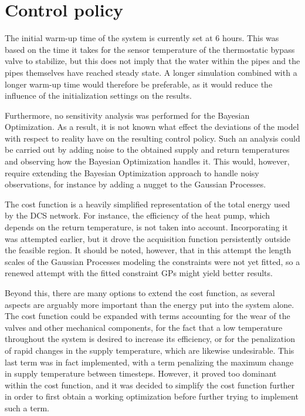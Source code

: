 

\section{Control policy}
The initial warm-up time of the system is currently set at 6 hours. This was based on the time it takes for the sensor temperature of the thermostatic bypass valve to stabilize, but this does not imply that the water within the pipes and the pipes themselves have reached steady state. A longer simulation combined with a longer warm-up time would therefore be preferable, as it would reduce the influence of the initialization settings on the results.

Furthermore, no sensitivity analysis was performed for the Bayesian 
Optimization. As a result, it is not known what effect the deviations of the model with respect to reality have on the resulting control policy. Such an analysis could be carried out by adding noise to the obtained supply and return temperatures and observing how the Bayesian Optimization handles it. This would, however, require extending the Bayesian Optimization approach to handle noisy observations, for instance by adding a nugget to the Gaussian Processes.

The cost function is a heavily simplified representation of the total energy used by the DCS network. For instance, the efficiency of the heat pump, which depends on the return temperature, is not taken into account. Incorporating it was attempted earlier, but it drove the acquisition function persistently outside the feasible region. It should be noted, however, that in this attempt the length scales of the Gaussian Processes modeling the constraints were not yet fitted, so a renewed attempt with the fitted constraint GPs might yield better results.

Beyond this, there are many options to extend the cost function, as several aspects are arguably more important than the energy put into the system alone. The cost function could be expanded with terms accounting for the wear of the valves and other mechanical components, for the fact that a low temperature throughout the system is desired to increase its efficiency, or for the penalization of rapid changes in the supply temperature, which are likewise undesirable. This last term was in fact implemented, with a term penalizing the maximum change in supply temperature between timesteps. However, it proved too dominant within the cost function, and it was decided to simplify the cost function further in order to first obtain a working optimization before further trying to implement such a term. 




